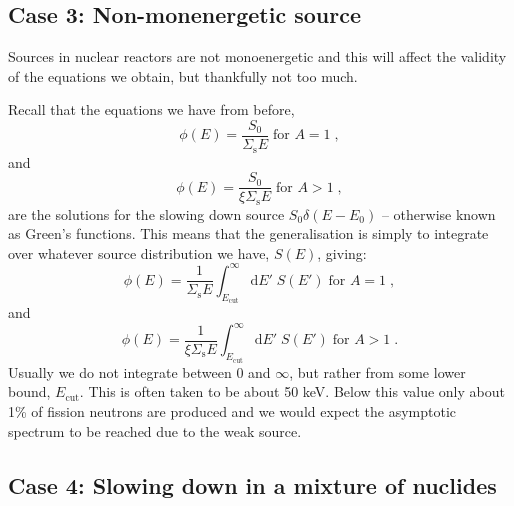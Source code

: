 \subsection{Case 3: Non-monenergetic source}

Sources in nuclear reactors are not monoenergetic and this will affect the validity of the equations we obtain, but thankfully not too much. 

Recall that the equations we have from before,
\begin{equation*}
    \phi(E) = \frac{S_0}{\Sigma_\mathrm{s}E} \;\text{for }A = 1\; \mathrm{,}
\end{equation*}
and
\begin{equation*}
    \phi(E) = \frac{S_0}{\xi\Sigma_\mathrm{s}E} \;\text{for }A > 1\;\mathrm{,}
\end{equation*}
are the solutions for the slowing down source $S_0\delta(E-E_0)$ -- otherwise known as Green's functions. This means that the generalisation is simply to integrate over whatever source distribution we have, $S(E)$, giving:
\begin{equation*}
    \phi(E) = \frac{1}{\Sigma_\mathrm{s}E} \int^\infty_{E_\mathrm{cut}}\mathrm{d}E'\;S(E')\;\text{for }A = 1\; \mathrm{,}
\end{equation*}
and
\begin{equation*}
    \phi(E) = \frac{1}{\xi\Sigma_\mathrm{s}E} \int^\infty_{E_\mathrm{cut}}\mathrm{d}E'\;S(E')\;\text{for }A > 1\;\mathrm{.}
\end{equation*}
Usually we do not integrate between $0$ and $\infty$, but rather from some lower bound, $E_\mathrm{cut}$. This is often taken to be about 50 keV. Below this value only about 1\% of fission neutrons are produced and we would expect the asymptotic spectrum to be reached due to the weak source.

\subsection{Case 4: Slowing down in a mixture of nuclides}

